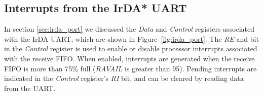 \subsection{Interrupts from the IrDA* UART}
In section \ref{sec:irda_port} we discussed the {\it Data} and {\it Control} registers associated
with the IrDA UART, which are shown in Figure~\ref{fig:irda_port}. The {\it RE} and bit in the 
{\it Control} register  is used to enable or disable processor interrupts
associated with the receive FIFO. When enabled, interrupts are generated when the receive 
FIFO is more than 75\% full ({\it RAVAIL} is greater than 95). Pending interrupts are indicated in the 
{\it Control} register's {\it RI} bit, and can be cleared by reading data from the UART.